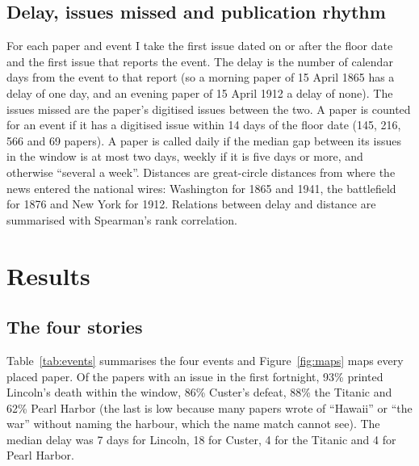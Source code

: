 \documentclass[11pt,a4paper]{article}
\begin{document}
\subsection{Delay, issues missed and publication rhythm}
For each paper and event I take the first issue dated on or after the floor date and the first issue that reports the event. The delay is the number of calendar days from the event to that report (so a morning paper of 15 April 1865 has a delay of one day, and an evening paper of 15 April 1912 a delay of none). The issues missed are the paper's digitised issues between the two. A paper is counted for an event if it has a digitised issue within 14 days of the floor date (145, 216, 566 and 69 papers). A paper is called daily if the median gap between its issues in the window is at most two days, weekly if it is five days or more, and otherwise ``several a week''. Distances are great-circle distances from where the news entered the national wires: Washington for 1865 and 1941, the battlefield for 1876 and New York for 1912. Relations between delay and distance are summarised with Spearman's rank correlation.

\section{Results}
\subsection{The four stories}
Table~\ref{tab:events} summarises the four events and Figure~\ref{fig:maps} maps every placed paper. Of the papers with an issue in the first fortnight, 93\% printed Lincoln's death within the window, 86\% Custer's defeat, 88\% the Titanic and 62\% Pearl Harbor (the last is low because many papers wrote of ``Hawaii'' or ``the war'' without naming the harbour, which the name match cannot see). The median delay was 7 days for Lincoln, 18 for Custer, 4 for the Titanic and 4 for Pearl Harbor.
\end{document}
